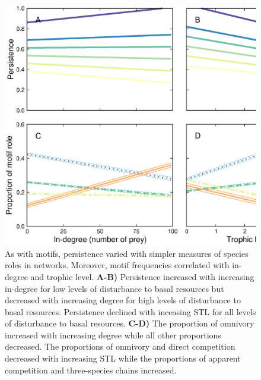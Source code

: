 \documentclass[12pt]{article}
\begin{document}
\begin{spacing}{2.0}
    \begin{figure}
        \centering
        \includegraphics[width=\textwidth]{figures/roles_vs_TL.eps}
        \caption{As with motifs, persistence varied with simpler measures of species roles in networks. Moreover, motif frequencies correlated with in-degree and trophic level. \textbf{A-B)} Persistence increased with increasing in-degree for low levels of disturbance to basal resources but decreased with increasing degree for high levels of disturbance to basal resources.
        Persistence declined with inceasing STL for all levels of disturbance to basal resources.
        \textbf{C-D)} The proportion of omnivory increased with increasing degree while all other proportions decreased. The proportions of omnivory and direct competition decreased with increasing STL while the proportions of apparent competition and three-species chains increased.}
        \label{fig:motifs_vs_TL_and_deg}
    \end{figure}        


\end{spacing}
\end{document}
